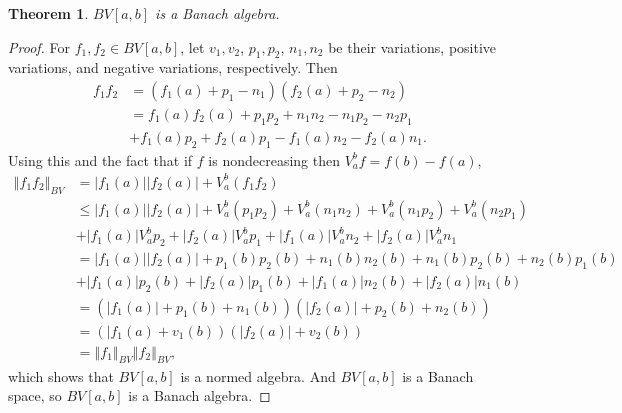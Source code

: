 \documentclass{article}
\newcommand{\norm}[1]{\left\Vert #1 \right\Vert}
\newtheorem{theorem}{Theorem}
\theoremstyle{definition}
\begin{document}
\begin{theorem}
$BV[a,b]$ is a Banach algebra.
\end{theorem}
\begin{proof}
For $f_1,f_2 \in BV[a,b]$, let $v_1,v_2$, $p_1,p_2$, $n_1,n_2$  be their variations, positive variations, and negative
variations, respectively. Then
\begin{align*}
f_1f_2&=(f_1(a)+p_1-n_1)(f_2(a)+p_2-n_2)\\
&=f_1(a)f_2(a)+p_1p_2 + n_1n_2 -n_1p_2-n_2p_1\\
&+ f_1(a)p_2+f_2(a)p_1-f_1(a)n_2-f_2(a)n_1.
\end{align*}
Using this and the fact that if $f$ is nondecreasing then $V_a^b f = f(b)-f(a)$,
\begin{align*}
\norm{f_1f_2}_{BV}&=|f_1(a)||f_2(a)|+V_a^b (f_1f_2)\\
&\leq |f_1(a)||f_2(a)|+V_a^b(p_1p_2)+V_a^b(n_1n_2)+ V_a^b(n_1p_2)+V_a^b (n_2p_1)\\
&+|f_1(a)| V_a^b p_2 + |f_2(a)| V_a^b p_1 + |f_1(a)| V_a^b n_2 + |f_2(a)| V_a^b n_1\\
&=|f_1(a)| |f_2(a)| + p_1(b) p_2(b) + n_1(b)n_2(b)+n_1(b)p_2(b)+n_2(b)p_1(b)\\
&+|f_1(a)| p_2(b) + |f_2(a)| p_1(b)+|f_1(a)| n_2(b)+ |f_2(a)| n_1(b)\\
&=(|f_1(a)|+p_1(b)+n_1(b))(|f_2(a)|+p_2(b)+n_2(b))\\
&=(|f_1(a)+v_1(b))(|f_2(a)|+v_2(b))\\
&=\norm{f_1}_{BV} \norm{f_2}_{BV},
\end{align*}
which shows that $BV[a,b]$ is a normed algebra. And $BV[a,b]$ is a Banach space, so  $BV[a,b]$ is a Banach algebra.
\end{proof}
\end{document}
